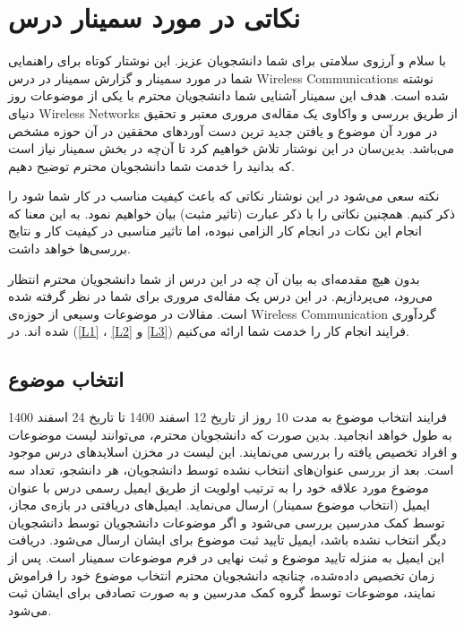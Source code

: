 \chapter{ نکاتی در مورد سمینار درس}
با سلام و آرزوی  سلامتی برای شما دانشجویان عزیز. این نوشتار کوتاه برای راهنمایی شما در مورد سمینار و گزارش سمینار در درس 
\glspl{Wireless Communication}
نوشته شده است. هدف این سمینار آشنایی شما دانشجویان محترم با یکی از موضوعات روز دنیای
\glspl{Wireless Network}
از طریق بررسی  و واکاوی یک مقاله‌ی مروری معتبر و تحقیق در مورد آن موضوع و یافتن جدید ترین دست آورد‌های محققین در آن حوزه مشخص می‌باشد. بدین‌سان در این نوشتار تلاش خواهیم کرد تا آن‌چه در بخش سمینار نیاز است که بدانید را خدمت شما دانشجویان محترم توضیح دهیم.

\begin{goal}{نکته}
	سعی می‌شود در این نوشتار نکاتی که باعث کیفیت مناسب در کار شما شود را ذکر کنیم. همچنین نکاتی را با ذکر  عبارت (تاثیر مثبت) بیان خواهیم نمود. به این معنا که انجام این نکات در انجام کار الزامی نبوده، اما تاثیر مناسبی در کیفیت کار و نتایج بررسی‌ها خواهد داشت.
\end{goal} 

بدون هیچ مقدمه‌ای به بیان آن چه در این درس از شما دانشجویان محترم انتظار می‌رود،  می‌پردازیم. در این درس یک مقاله‌ی مروری برای شما در نظر گرفته‌ شده است. مقالات در موضوعات وسیعی از حوزه‌ی 
\gls{Wireless Communication}
گردآوری شده اند. در
(\autoref{L1}
،
\autoref{L2}
و
\autoref{L3})
فرایند انجام کار را خدمت شما ارائه می‌کنیم. 

\section{انتخاب موضوع}\label{L1}
فرایند انتخاب موضوع به مدت 10 روز از تاریخ 12 اسفند 1400 تا تاریخ 24 اسفند 1400 به طول خواهد انجامید. بدین صورت که دانشجویان محترم، می‌توانند لیست موضوعات و افراد تخصیص یافته  را بررسی می‌نمایند. این لیست در مخزن اسلاید‌های درس موجود است. بعد از بررسی عنوان‌های انتخاب نشده  توسط دانشجویان،   هر دانشجو، تعداد سه موضوع مورد علاقه خود را به ترتیب اولویت از طریق ایمیل رسمی درس با عنوان ایمیل (انتخاب موضوع سمینار) ارسال می‌نماید. ایمیل‌های دریافتی در بازه‌ی مجاز، توسط کمک مدرسین بررسی می‌شود و اگر موضوعات دانشجویان توسط دانشجویان دیگر انتخاب نشده‌ باشد، ایمیل تایید ثبت موضوع برای ایشان ارسال می‌شود. دریافت این ایمیل به منزله تایید موضوع و ثبت نهایی در فرم موضوعات سمینار است.  پس از زمان تخصیص داده‌شده،  چنانچه دانشجویان محترم انتخاب موضوع خود را فراموش نمایند، موضوعات توسط گروه کمک مدرسین و به صورت تصادفی برای ایشان ثبت می‌شود.  
